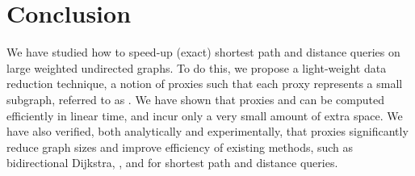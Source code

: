 \section{Conclusion}
\label{sec-con}

We have studied how to speed-up (exact)  shortest path and distance queries on large weighted undirected graphs.
To do this, we  propose  a light-weight data reduction technique, a notion of proxies such that each proxy represents a small subgraph, referred to as \dras. We have shown that
proxies and \dras can be computed efficiently in linear time, and incur only a very small amount of extra space.  We have also verified,
both analytically and experimentally, that proxies significantly reduce graph sizes and improve efficiency of existing methods, such as bidirectional Dijkstra, \arcflag, \tnr and \ah for shortest path and distance queries.


